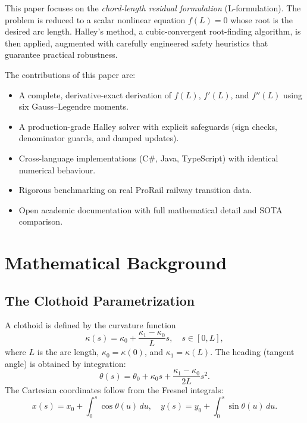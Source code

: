 \documentclass[11pt,a4paper]{article}
\begin{document}
This paper focuses on the \emph{chord-length residual formulation} (L-formulation). The problem is reduced to a scalar nonlinear equation $f(L) = 0$ whose root is the desired arc length. Halley's method, a cubic-convergent root-finding algorithm, is then applied, augmented with carefully engineered safety heuristics that guarantee practical robustness.

The contributions of this paper are:
\begin{itemize}
    \item A complete, derivative-exact derivation of $f(L)$, $f'(L)$, and $f''(L)$ using six Gauss--Legendre moments.
    \item A production-grade Halley solver with explicit safeguards (sign checks, denominator guards, and damped updates).
    \item Cross-language implementations (C\#, Java, TypeScript) with identical numerical behaviour.
    \item Rigorous benchmarking on real ProRail railway transition data.
    \item Open academic documentation with full mathematical detail and SOTA comparison.
\end{itemize}

\section{Mathematical Background}

\subsection{The Clothoid Parametrization}
A clothoid is defined by the curvature function
\[
\kappa(s) = \kappa_0 + \frac{\kappa_1 - \kappa_0}{L} s, \quad s \in [0, L],
\]
where $L$ is the arc length, $\kappa_0 = \kappa(0)$, and $\kappa_1 = \kappa(L)$. The heading (tangent angle) is obtained by integration:
\[
\theta(s) = \theta_0 + \kappa_0 s + \frac{\kappa_1 - \kappa_0}{2L} s^2.
\]
The Cartesian coordinates follow from the Fresnel integrals:
\[
x(s) = x_0 + \int_0^s \cos\theta(u)\, du, \quad
y(s) = y_0 + \int_0^s \sin\theta(u)\, du.
\]
\end{document}
